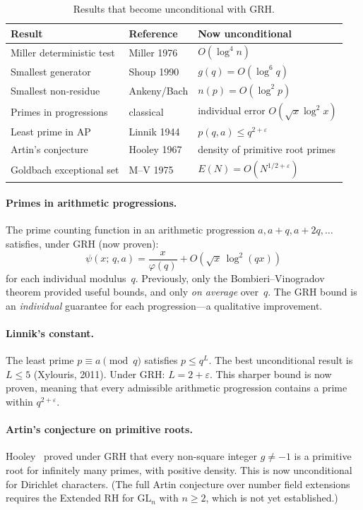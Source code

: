 \documentclass[11pt]{article}
\theoremstyle{plain}
\theoremstyle{definition}
\theoremstyle{remark}
\begin{document}
\begin{table}[ht]
\centering
\begin{tabular}{lll}
\toprule
\textbf{Result} & \textbf{Reference} & \textbf{Now unconditional} \\
\midrule
Miller deterministic test & Miller 1976 & $O(\log^4 n)$ \\
Smallest generator & Shoup 1990 & $g(q) = O(\log^6 q)$ \\
Smallest non-residue & Ankeny/Bach & $n(p) = O(\log^2 p)$ \\
Primes in progressions & classical & individual error $O(\sqrt{x}\log^2 x)$ \\
Least prime in AP & Linnik 1944 & $p(q,a) \leq q^{2+\varepsilon}$ \\
Artin's conjecture & Hooley 1967 & density of primitive root primes \\
Goldbach exceptional set & M--V 1975 & $E(N) = O(N^{1/2+\varepsilon})$ \\
\bottomrule
\end{tabular}
\caption{Results that become unconditional with GRH.}
\label{tab:results}
\end{table}

\paragraph{Primes in arithmetic progressions.}
The prime counting function in an arithmetic progression
$a, a{+}q, a{+}2q, \ldots$ satisfies, under GRH (now proven):
\[
\psi(x;\, q, a) = \frac{x}{\varphi(q)}
+ O\!\left(\sqrt{x}\,\log^2(qx)\right)
\]
for each individual modulus~$q$. Previously, only the
Bombieri--Vinogradov theorem provided useful bounds, and only
\emph{on average} over~$q$. The GRH bound is an \emph{individual}
guarantee for each progression---a qualitative improvement.

\paragraph{Linnik's constant.}
The least prime $p \equiv a \pmod{q}$ satisfies $p \leq q^L$.
The best unconditional result is $L \leq 5$ (Xylouris, 2011).
Under GRH: $L = 2 + \varepsilon$. This sharper bound is now proven,
meaning that every admissible arithmetic progression contains a
prime within $q^{2+\varepsilon}$.

\paragraph{Artin's conjecture on primitive roots.}
Hooley~\cite{Hooley1967} proved under GRH that every non-square
integer $g \neq -1$ is a primitive root for infinitely many primes,
with positive density. This is now unconditional for Dirichlet
characters. (The full Artin conjecture over number field extensions
requires the Extended RH for $\mathrm{GL}_n$ with $n \geq 2$,
which is not yet established.)
\end{document}
